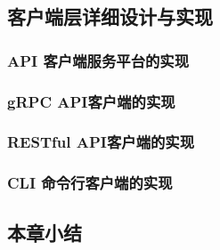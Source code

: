         

  \subsection{客户端层详细设计与实现}
  	
		\subsubsection{API 客户端服务平台的实现}
		
		
		\subsubsection{gRPC API客户端的实现}
		
		
	 	\subsubsection{RESTful API客户端的实现}
	 	
	 	
		\subsubsection{CLI 命令行客户端的实现}
		


	\subsection{本章小结}
 \clearpage